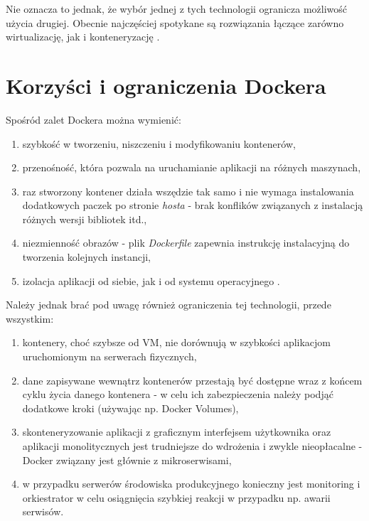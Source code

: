 Nie oznacza to jednak, że wybór jednej z tych technologii ogranicza możliwość użycia drugiej. Obecnie najczęściej spotykane są rozwiązania łączące zarówno wirtualizację, jak i konteneryzację \cite{nickoloff}.

\section{Korzyści i ograniczenia Dockera}

Spośród zalet Dockera można wymienić:

\begin{enumerate}[(1)]
    \item szybkość w tworzeniu, niszczeniu i modyfikowaniu kontenerów,
    \item przenośność, która pozwala na uruchamianie aplikacji na różnych maszynach, 
    \item raz stworzony kontener działa wszędzie tak samo i nie wymaga instalowania dodatkowych paczek po stronie \textit{hosta} - brak konflików związanych z instalacją różnych wersji bibliotek itd.,
    \item niezmienność obrazów - plik \textit{Dockerfile} zapewnia instrukcję instalacyjną do tworzenia kolejnych instancji, 
    \item izolacja aplikacji od siebie, jak i od systemu operacyjnego \cite{nickoloff, krochmalski}.
\end{enumerate}

Należy jednak brać pod uwagę również ograniczenia tej technologii, przede wszystkim:

\begin{enumerate}[(1)]
    \item kontenery, choć szybsze od VM, nie dorównują w szybkości aplikacjom uruchomionym na serwerach fizycznych,
    \item dane zapisywane wewnątrz kontenerów przestają być dostępne wraz z końcem cyklu życia danego kontenera - w celu ich zabezpieczenia należy podjąć dodatkowe kroki (używając np. Docker Volumes),
    \item skonteneryzowanie aplikacji z graficznym interfejsem użytkownika oraz aplikacji monolitycznych jest trudniejsze do wdrożenia i zwykle nieopłacalne - Docker związany jest głównie z mikroserwisami,
    \item w przypadku serwerów środowiska produkcyjnego konieczny jest monitoring i orkiestrator w celu osiągnięcia szybkiej reakcji w przypadku np. awarii serwisów.
\end{enumerate}


